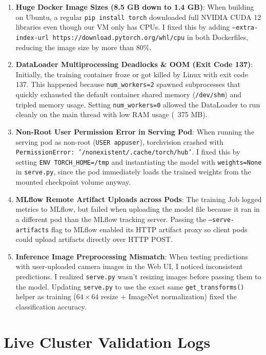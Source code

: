 \documentclass[11pt,a4paper]{article}
\begin{document}
\begin{enumerate}
    \item \textbf{Huge Docker Image Sizes (8.5 GB down to 1.4 GB)}:  
    When building on Ubuntu, a regular \texttt{pip install torch} downloaded full NVIDIA CUDA 12 libraries even though our VM only has CPUs. I fixed this by adding \texttt{--extra-index-url https://download.pytorch.org/whl/cpu} in both Dockerfiles, reducing the image size by more than 80\%.

    \item \textbf{DataLoader Multiprocessing Deadlocks \& OOM (Exit Code 137)}:  
    Initially, the training container froze or got killed by Linux with exit code 137. This happened because \texttt{num\_workers=2} spawned subprocesses that quickly exhausted the default container shared memory (\texttt{/dev/shm}) and tripled memory usage. Setting \texttt{num\_workers=0} allowed the DataLoader to run cleanly on the main thread with low RAM usage (~375 MB).

    \item \textbf{Non-Root User Permission Error in Serving Pod}:  
    When running the serving pod as non-root (\texttt{USER appuser}), torchvision crashed with \texttt{PermissionError: '/nonexistent/.cache/torch/hub'}. I fixed this by setting \texttt{ENV TORCH\_HOME=/tmp} and instantiating the model with \texttt{weights=None} in \texttt{serve.py}, since the pod immediately loads the trained weights from the mounted checkpoint volume anyway.

    \item \textbf{MLflow Remote Artifact Uploads across Pods}:  
    The training Job logged metrics to MLflow, but failed when uploading the model file because it ran in a different pod than the MLflow tracking server. Passing the \texttt{--serve-artifacts} flag to MLflow enabled its HTTP artifact proxy so client pods could upload artifacts directly over HTTP POST.

    \item \textbf{Inference Image Preprocessing Mismatch}:  
    When testing predictions with user-uploaded camera images in the Web UI, I noticed inconsistent predictions. I realized \texttt{serve.py} wasn't resizing images before passing them to the model. Updating \texttt{serve.py} to use the exact same \texttt{get\_transforms()} helper as training ($64 \times 64$ resize + ImageNet normalization) fixed the classification accuracy.
\end{enumerate}

\section{Live Cluster Validation Logs}
\end{document}
